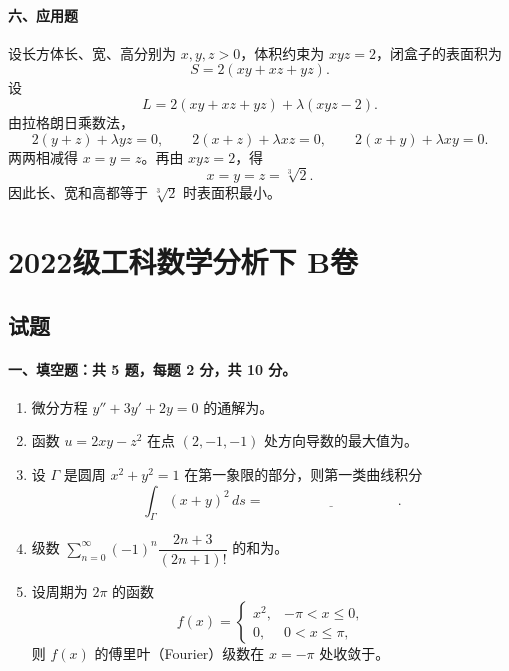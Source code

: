 \paragraph*{六、应用题}
设长方体长、宽、高分别为 $x,y,z>0$，体积约束为 $xyz=2$，闭盒子的表面积为
\[
  S=2(xy+xz+yz).
\]
设
\[
  L=2(xy+xz+yz)+\lambda(xyz-2).
\]
由拉格朗日乘数法，
\[
  2(y+z)+\lambda yz=0,\qquad
  2(x+z)+\lambda xz=0,\qquad
  2(x+y)+\lambda xy=0.
\]
两两相减得 $x=y=z$。再由 $xyz=2$，得
\[
  x=y=z=\sqrt[3]{2}.
\]
因此长、宽和高都等于 $\sqrt[3]{2}$ 时表面积最小。

\section{2022级工科数学分析下 B卷}

\subsection{试题}

\paragraph*{一、填空题：共 5 题，每题 2 分，共 10 分。}
\begin{enumerate}
  \item 微分方程 $y''+3y'+2y=0$ 的通解为\underline{\hspace{4cm}}。
  \item 函数 $u=2xy-z^2$ 在点 $(2,-1,-1)$ 处方向导数的最大值为\underline{\hspace{4cm}}。
  \item 设 $\Gamma$ 是圆周 $x^2+y^2=1$ 在第一象限的部分，则第一类曲线积分
  \[
    \int_\Gamma (x+y)^2\,ds=\underline{\hspace{4cm}}.
  \]
  \item 级数 $\displaystyle \sum_{n=0}^{\infty}(-1)^n\dfrac{2n+3}{(2n+1)!}$ 的和为\underline{\hspace{4cm}}。
  \item 设周期为 $2\pi$ 的函数
  \[
    f(x)=
    \begin{cases}
      x^2, & -\pi<x\le 0,\\
      0, & 0<x\le \pi,
    \end{cases}
  \]
  则 $f(x)$ 的傅里叶（Fourier）级数在 $x=-\pi$ 处收敛于\underline{\hspace{4cm}}。
\end{enumerate}

